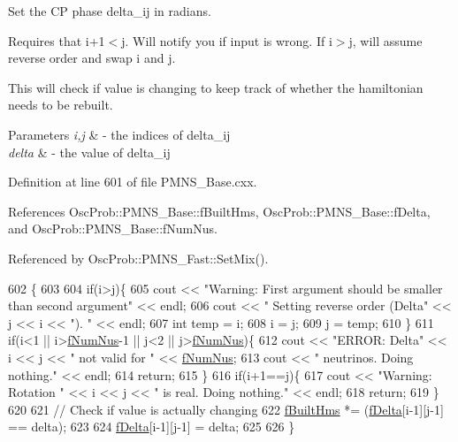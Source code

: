 Set the CP phase delta\+\_\+ij in radians.

Requires that i+1$<$j. Will notify you if input is wrong. If i$>$j, will assume reverse order and swap i and j.

This will check if value is changing to keep track of whether the hamiltonian needs to be rebuilt.


\begin{DoxyParams}{Parameters}
{\em i,j} & -\/ the indices of delta\+\_\+ij \\
\hline
{\em delta} & -\/ the value of delta\+\_\+ij \\
\hline
\end{DoxyParams}


Definition at line 601 of file P\+M\+N\+S\+\_\+\+Base.\+cxx.



References Osc\+Prob\+::\+P\+M\+N\+S\+\_\+\+Base\+::f\+Built\+Hms, Osc\+Prob\+::\+P\+M\+N\+S\+\_\+\+Base\+::f\+Delta, and Osc\+Prob\+::\+P\+M\+N\+S\+\_\+\+Base\+::f\+Num\+Nus.



Referenced by Osc\+Prob\+::\+P\+M\+N\+S\+\_\+\+Fast\+::\+Set\+Mix().


\begin{DoxyCode}
602 \{
603 
604   \textcolor{keywordflow}{if}(i>j)\{
605     cout << \textcolor{stringliteral}{"Warning: First argument should be smaller than second argument"} << endl;
606     cout << \textcolor{stringliteral}{"         Setting reverse order (Delta"} << j << i << \textcolor{stringliteral}{"). "} << endl;
607     \textcolor{keywordtype}{int} temp = i;
608     i = j;
609     j = temp;
610   \}
611   \textcolor{keywordflow}{if}(i<1 || i>\hyperlink{classOscProb_1_1PMNS__Base_a24bb74bed63569dfe88b18fa6a08060e}{fNumNus}-1 || j<2 || j>\hyperlink{classOscProb_1_1PMNS__Base_a24bb74bed63569dfe88b18fa6a08060e}{fNumNus})\{
612     cout << \textcolor{stringliteral}{"ERROR: Delta"} << i << j << \textcolor{stringliteral}{" not valid for "} << \hyperlink{classOscProb_1_1PMNS__Base_a24bb74bed63569dfe88b18fa6a08060e}{fNumNus};
613     cout << \textcolor{stringliteral}{" neutrinos. Doing nothing."} << endl;
614     \textcolor{keywordflow}{return};
615   \}
616   \textcolor{keywordflow}{if}(i+1==j)\{
617     cout << \textcolor{stringliteral}{"Warning: Rotation "} << i << j << \textcolor{stringliteral}{" is real. Doing nothing."} << endl;
618     \textcolor{keywordflow}{return};
619   \}
620 
621   \textcolor{comment}{// Check if value is actually changing}
622   \hyperlink{classOscProb_1_1PMNS__Base_a9ac3cadeac8db1b90f3152f476244780}{fBuiltHms} *= (\hyperlink{classOscProb_1_1PMNS__Base_ab2a5fa40e689b221c8a7d2c17213810d}{fDelta}[i-1][j-1] == delta);
623 
624   \hyperlink{classOscProb_1_1PMNS__Base_ab2a5fa40e689b221c8a7d2c17213810d}{fDelta}[i-1][j-1] = delta;
625 
626 \}
\end{DoxyCode}
\mbox{\label{classOscProb_1_1PMNS__Fast_a63733b246e6d2e609ce3de7a65ba5b9f}} 
